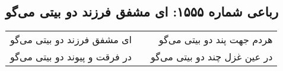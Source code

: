 \begin{center}
\section*{رباعی شماره ۱۵۵۵: ای مشفق فرزند دو بیتی می‌گو}
\label{sec:1555}
\begin{longtable}{l p{0.5cm} r}
ای مشفق فرزند دو بیتی می‌گو
&&
هردم جهت پند دو بیتی می‌گو
\\
در فرقت و پیوند دو بیتی می‌گو
&&
در عین غزل چند دو بیتی می‌گو
\\
\end{longtable}
\end{center}
